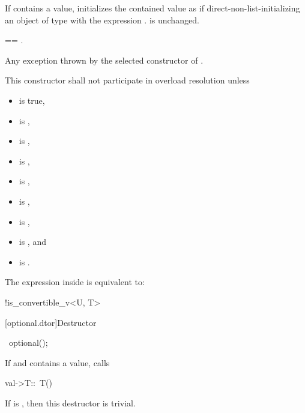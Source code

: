 \begin{itemdescr}
\pnum
\effects
If  contains a value,
initializes the contained value as if direct-non-list-initializing
an object of type  with the expression .
 is unchanged.

\pnum
\ensures
{} == .

\pnum
\throws
Any exception thrown by the selected constructor of .

\pnum
\remarks
This constructor shall not participate in overload resolution unless
\begin{itemize}
\item {} is true,
\item {} is ,
\item {} is ,
\item {} is ,
\item {} is ,
\item {} is ,
\item {} is ,
\item {} is , and
\item {} is .
\end{itemize}
The expression inside  is equivalent to:
\begin{codeblock}
!is_convertible_v<U, T>
\end{codeblock}
\end{itemdescr}

[optional.dtor]{Destructor}

%
\begin{itemdecl}
~optional();
\end{itemdecl}

\begin{itemdescr}
\pnum
\effects
If  and  contains a value, calls
\begin{codeblock}
val->T::~T()
\end{codeblock}

\pnum
\remarks
If  is , then this destructor is trivial.
\end{itemdescr}

